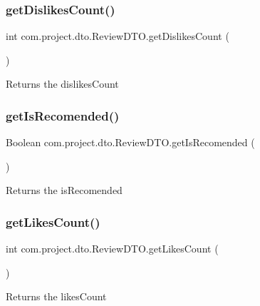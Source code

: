 \subsubsection{get\+Dislikes\+Count()}
{\footnotesize\ttfamily int com.\+project.\+dto.\+Review\+D\+T\+O.\+get\+Dislikes\+Count (\begin{DoxyParamCaption}{ }\end{DoxyParamCaption})}

\begin{DoxyReturn}{Returns}
the dislikes\+Count 
\end{DoxyReturn}
\mbox{\label{classcom_1_1project_1_1dto_1_1_review_d_t_o_afce41cc3fa88731b17d89b73673e2ccb}} 
\subsubsection{get\+Is\+Recomended()}
{\footnotesize\ttfamily Boolean com.\+project.\+dto.\+Review\+D\+T\+O.\+get\+Is\+Recomended (\begin{DoxyParamCaption}{ }\end{DoxyParamCaption})}

\begin{DoxyReturn}{Returns}
the is\+Recomended 
\end{DoxyReturn}
\mbox{\label{classcom_1_1project_1_1dto_1_1_review_d_t_o_aab973053d931109f3f104380ef5ee092}} 
\subsubsection{get\+Likes\+Count()}
{\footnotesize\ttfamily int com.\+project.\+dto.\+Review\+D\+T\+O.\+get\+Likes\+Count (\begin{DoxyParamCaption}{ }\end{DoxyParamCaption})}

\begin{DoxyReturn}{Returns}
the likes\+Count 
\end{DoxyReturn}
\mbox{\label{classcom_1_1project_1_1dto_1_1_review_d_t_o_a0ea4b143d749f6902b7353e75411a77f}} 
